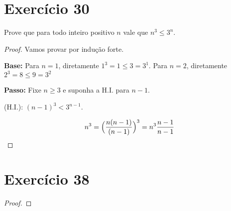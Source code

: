 \documentclass{article}
\begin{document}
\section*{Exercício 30}
Prove que para todo inteiro positivo $n$ vale que $n^3 \leq 3^n$.
\begin{proof}
Vamos provar por indução forte.

\textbf{Base: } Para $n=1$, diretamente $1^3 = 1 \leq 3 = 3^1$.
Para $n=2$, diretamente $2^3 = 8 \leq 9 = 3^2$

\textbf{Passo: } Fixe $n \geq 3$ e suponha a H.I. para $n-1$.

\begin{center}
(H.I.): $(n-1)^3 < 3^{n-1}$.
\end{center}

\begin{align*}
    n^3 = \Bigl( \dfrac{n (n-1)}{(n-1)} \Bigr)^3 = n^3 \dfrac{n-1}{n-1}
\end{align*}

\end{proof}

\section*{Exercício 38}
\begin{proof}
    
\end{proof}
\end{document}
